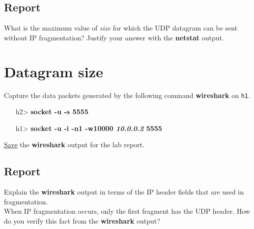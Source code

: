 \documentclass[10pt,a4paper]{article}
\numberwithin{equation}{section}
\numberwithin{figure}{section}
\numberwithin{table}{section}
\begin{document}
\subsection*{Report}
What is the maximum value of \textit{size} for which the UDP datagram can be sent without IP fragmentation?
Justify your answer with the \textbf{netstat} output.

\section{Datagram size}
Capture the data packets generated by the following command \textbf{wireshark} on \texttt{h1}. \\

\begin{itemize}
	\item [h2>] \textbf{socket -u -s 5555}
	\item [h1>] \textbf{socket -u -i -n1 -w10000 \textit{10.0.0.2} 5555}
\end{itemize}
\underline{Save} the \textbf{wireshark} output for the lab report.
\subsection*{Report}
Explain the \textbf{wireshark} output in terms of the IP header fields that are used in fragmentation. \\
When IP fragmentation occurs, only the first fragment has the UDP header.
How do you verify this fact from the \textbf{wireshark} output?

\end{document}
